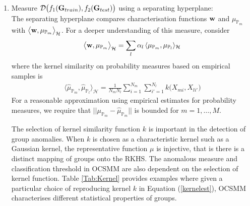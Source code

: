 \begin{enumerate}[3.]
\item Measure $ \mathcal{D}\big( f_1({\bf G}_{train}), f_2({\bf G}_{test})\big )$ using a separating hyperplane: \\
The separating hyperplane compares characterisation functions ${\bf w}$ and $\mu_{\mathbb{P}_m }  $ with
$ \big\langle {\bf w},\mu_{\mathbb{P}_m } \big \rangle_\mathcal{H}%
$.  
 For a deeper understanding of this measure, consider  
\begin{align*}
 \big\langle {\bf w},\mu_{\mathbb{P}_m } \big \rangle_\mathcal{H}= \sum_{l} \alpha_l \, \langle \mu_{\mathbb{P}_m}, \mu_{\mathbb{P}_l}\rangle_\mathcal{H} 
\end{align*} 
where the kernel similarity on probability measures based on empirical samples is 
\begin{align}
\langle \hat{\mu}_{\mathbb{P}_m},\hat{\mu}_{\mathbb{P}_l} \rangle_\mathcal{H}  
=
\frac{1}{N_m   N_l } \sum_{i=1}^{N_m}
 \sum_{i'=1}^{N_l} k\Big( X_{mi} , 
 X_{li'}  \Big)  \label{kernelest}
 \end{align}
 For a reasonable approximation using empirical estimates for probability measures, we require that  $||  \mu_{\mathbb{P}_m}  - \hat{\mu}_{ \mathbb{P}_m}  || $ is bounded   for $m=1,\dots,M$.   

  The selection of kernel similarity function $k$ is important in the detection of group anomalies.
When $k$ is chosen as a characteristic kernel such as a  Gaussian   kernel, the representative function $\mu$ is injective, that is there is a distinct mapping of groups onto the RKHS. The anomalous measure and classification threshold in  OCSMM are also dependent on the selection of kernel function. Table \ref{Tab:Kernel} provides examples where given a particular choice of reproducing kernel  $k$ in Equation (\ref{kernelest}), OCSMM characterises different statistical properties of  groups. 


\end{enumerate}
